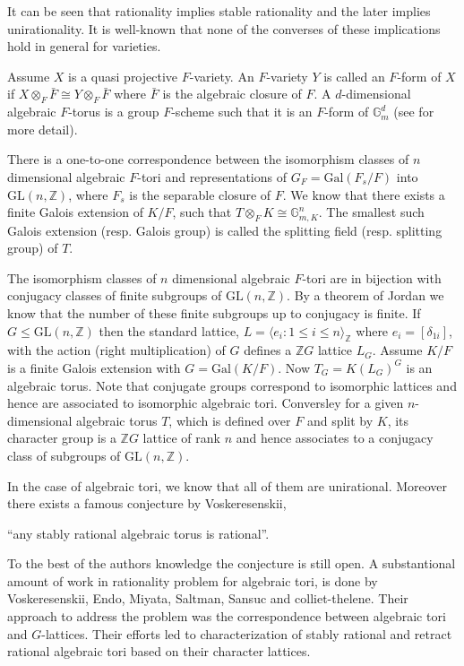 \documentclass[a4paper, 14pt]{extarticle}
\theoremstyle{plain}
\theoremstyle{definition}
\newcommand{\Z}{\ensuremath{\mathbb{Z}}}
\begin{document}
It can be seen that rationality implies stable rationality and the later implies 
unirationality. It is well-known that none of the converses of these implications
hold in general for varieties. 

Assume $X$ is a quasi projective $F$-variety. An $F$-variety $Y$ is called an 
$F$-form of $X$ if $X \otimes_F \bar{F} \cong Y \otimes_F \bar{F}$ where $\bar{F}$ is the algebraic closure of $F$. A $d$-dimensional algebraic 
$F$-torus is a group $F$-scheme such that it is an $F$-form of $\mathbb{G}_m^d$ (see \cite[Section 1.3]{Voskresenskii} for more detail).


There is a one-to-one correspondence between the isomorphism classes of 
$n$ dimensional algebraic $F$-tori and representations of $G_F = \mathrm{Gal}(F_s/F)$ 
into $\mathrm{GL}(n,\Z)$, where $F_s$ is the separable closure of $F$. We know that
 there exists a finite Galois extension of $K/F$, such that 
$T \otimes_F K \cong \mathbb{G}_{m,K}^n$. The smallest such Galois extension 
(resp. Galois group) is called the splitting field (resp. splitting group)
 of $T$.
 
The isomorphism classes of $n$ dimensional algebraic $F$-tori are in bijection 
with conjugacy classes of finite subgroups of $\mathrm{GL}(n,\Z)$. By a theorem of Jordan
 we know that the number 
of these finite subgroups up to conjugacy is finite. If $G \leq \mathrm{GL}(n,\Z)$ then 
the standard lattice, $L = \langle e_i: 1 \leq i \leq n \rangle_\Z$ where $e_i = [\delta_{1i}]$,
with the action (right multiplication) of $G$ defines a $\Z G$ lattice $L_G$. 
Assume $K/F$ is a finite Galois extension with $G = \mathrm{Gal}(K/F)$. Now $T_G = K(L_G)^G$
is an algebraic torus. Note that conjugate groups correspond to isomorphic 
lattices and hence are associated to isomorphic algebraic tori. Conversley for 
a given $n$-dimensional algebraic torus $T$, which is defined over $F$ and split 
by $K$, its character group is a $\Z G$ lattice of rank $n$ and hence associates 
to a conjugacy class of subgroups of $\mathrm{GL}(n,\Z)$.  

In the case of algebraic tori, we know that all of them are unirational. 
Moreover there exists a famous conjecture by Voskeresenskii,
\begin{center}
 ``any stably rational algebraic torus is rational''.
 \end{center} To the 
best of the authors knowledge the conjecture is still open. A substantional amount of work in rationality problem for algebraic tori, is done by Voskeresenskii, Endo, Miyata, Saltman, 
Sansuc and colliet-thelene. Their approach to address the problem was the
correspondence between algebraic tori and $G$-lattices. Their efforts led to 
characterization of stably rational and retract rational algebraic tori based 
on their character lattices.
\end{document}
